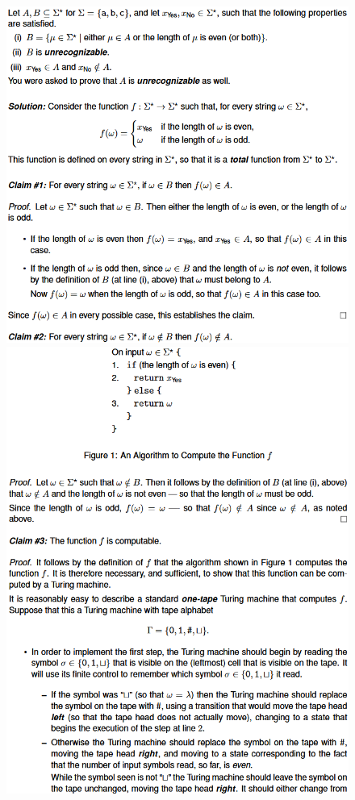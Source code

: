 \documentclass[8pt]{extarticle}
\begin{document}
\begin{figure}
    \begin{minipage}{0.333\textwidth}
        \includegraphics[width=\linewidth]{reduction1.png}
    \end{minipage}\hfill
    \begin{minipage}{0.333\textwidth}
        \centering
        \includegraphics[width=\linewidth]{reduction2.png}

\end{minipage}
\end{figure}
\end{document}
